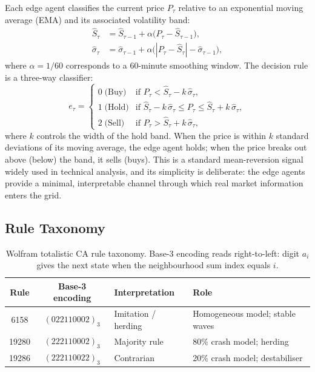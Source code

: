 \documentclass{article}
\theoremstyle{definition}
\theoremstyle{remark}
\begin{document}
Each edge agent classifies the current price $P_\tau$ relative to an exponential moving
average (EMA) and its associated volatility band:
\begin{align}
  \hat{S}_\tau &= \hat{S}_{\tau-1} + \alpha\bigl(P_\tau - \hat{S}_{\tau-1}\bigr), \label{eq:ema} \\
  \hat{\sigma}_\tau &= \hat{\sigma}_{\tau-1} + \alpha\bigl(|P_\tau - \hat{S}_\tau| - \hat{\sigma}_{\tau-1}\bigr), \label{eq:ema-vol}
\end{align}
where $\alpha = 1/60$ corresponds to a 60-minute smoothing window. The decision rule
is a three-way classifier:
\begin{equation}
  e_\tau = \begin{cases}
    0 \;\text{(Buy)}  & \text{if } P_\tau < \hat{S}_\tau - k\,\hat{\sigma}_\tau, \\
    1 \;\text{(Hold)} & \text{if } \hat{S}_\tau - k\,\hat{\sigma}_\tau \le P_\tau \le \hat{S}_\tau + k\,\hat{\sigma}_\tau, \\
    2 \;\text{(Sell)} & \text{if } P_\tau > \hat{S}_\tau + k\,\hat{\sigma}_\tau,
  \end{cases}
  \label{eq:edge-state}
\end{equation}
where $k$ controls the width of the hold band. When the price is within $k$ standard
deviations of its moving average, the edge agent holds; when the price breaks out above
(below) the band, it sells (buys). This is a standard mean-reversion signal widely used
in technical analysis, and its simplicity is deliberate: the edge agents provide a minimal,
interpretable channel through which real market information enters the grid.

\subsection{Rule Taxonomy}
\label{sec:rule-taxonomy}

\begin{table}[tb]
\centering
\caption{Wolfram totalistic CA rule taxonomy. Base-3 encoding reads
right-to-left: digit $a_i$ gives the next state when the neighbourhood
sum index equals $i$.}
\label{tab:rule-taxonomy}
\small
\begin{tabular}{ccll}
\toprule
Rule & Base-3 encoding & Interpretation & Role \\
\midrule
6158 & $(022110002)_{3}$ & Imitation / herding & Homogeneous model; stable waves \\
19280 & $(222110002)_{3}$ & Majority rule & 80\% crash model; herding \\
19286 & $(222110022)_{3}$ & Contrarian & 20\% crash model; destabiliser \\
\bottomrule
\end{tabular}
\end{table}
\end{document}
